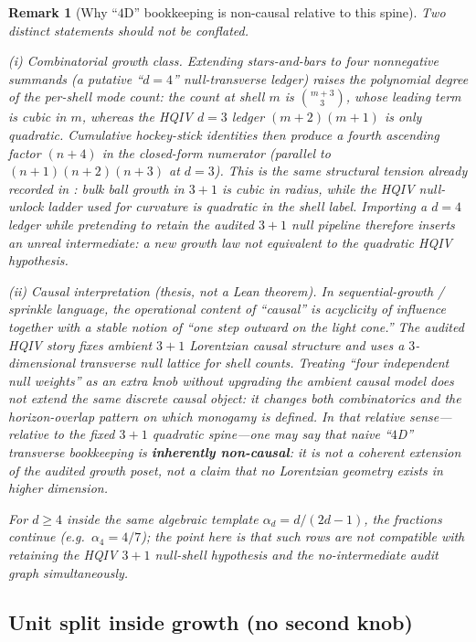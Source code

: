 \documentclass[11pt]{amsart}
\newtheorem{remark}[theorem]{Remark}
\begin{document}
\begin{remark}[Why ``\(4\)D'' bookkeeping is non-causal relative to this spine]
\label{rem:four-d-noncausal}
Two distinct statements should not be conflated.

\emph{(i) Combinatorial growth class.} Extending stars-and-bars to \emph{four} nonnegative summands (a putative ``\(d=4\)'' null-transverse ledger) raises the \emph{polynomial degree} of the per-shell mode count: the count at shell \(m\) is \(\binom{m+3}{3}\), whose leading term is cubic in \(m\), whereas the HQIV \(d=3\) ledger \((m+2)(m+1)\) is only quadratic. Cumulative hockey-stick identities then produce a fourth ascending factor \((n+4)\) in the closed-form numerator (parallel to \((n+1)(n+2)(n+3)\) at \(d=3\)). This is the same structural tension already recorded in \cite{hqiv-so8-paper}: bulk ball growth in \(3{+}1\) is cubic in radius, while the HQIV \emph{null-unlock} ladder used for curvature is quadratic in the shell label. Importing a \(d=4\) ledger while pretending to retain the audited \(3+1\) null pipeline therefore inserts an \emph{unreal intermediate}: a new growth law not equivalent to the quadratic HQIV hypothesis.

\emph{(ii) Causal interpretation (thesis, not a Lean theorem).} In sequential-growth / sprinkle language, the operational content of ``causal'' is acyclicity of influence together with a stable notion of ``one step outward on the light cone.'' The audited HQIV story fixes ambient \(3{+}1\) Lorentzian causal structure and uses a \(3\)-dimensional transverse null lattice for shell counts. Treating ``four independent null weights'' as an extra knob without upgrading the ambient causal model does not extend the \emph{same} discrete causal object: it changes both combinatorics and the horizon-overlap pattern on which monogamy is defined. In that \emph{relative} sense---relative to the fixed \(3+1\) quadratic spine---one may say that naive ``\(4\)D'' transverse bookkeeping is \textbf{inherently non-causal}: it is not a coherent extension of the audited growth poset, not a claim that no Lorentzian geometry exists in higher dimension.

For \(d\ge 4\) inside the \emph{same} algebraic template \(\alpha_d=d/(2d-1)\), the fractions continue (e.g.\ \(\alpha_4=4/7\)); the point here is that such rows are \emph{not} compatible with retaining the HQIV \(3+1\) null-shell hypothesis and the no-intermediate audit graph simultaneously.
\end{remark}

\subsection{Unit split inside growth (no second knob)}
\end{document}
